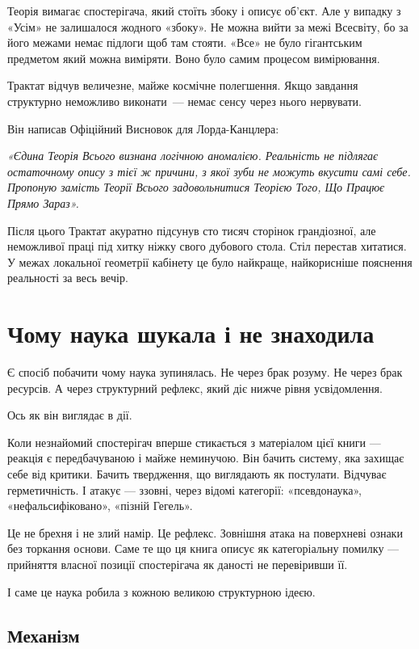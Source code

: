 \documentclass[12pt, a4paper, openany]{book}
\begin{document}
\begin{terrybox}
Теорія вимагає спостерігача, який стоїть збоку і описує об'єкт. Але у випадку з «Усім» не залишалося жодного «збоку». Не можна вийти за межі Всесвіту, бо за його межами немає підлоги щоб там стояти. «Все» не було гігантським предметом який можна виміряти. Воно було самим процесом вимірювання.

Трактат відчув величезне, майже космічне полегшення. Якщо завдання структурно неможливо виконати~--- немає сенсу через нього нервувати.

Він написав Офіційний Висновок для Лорда-Канцлера:

\medskip
\textit{«Єдина Теорія Всього визнана логічною аномалією. Реальність не підлягає остаточному опису з тієї ж причини, з якої зуби не можуть вкусити самі себе. Пропоную замість Теорії Всього задовольнитися Теорією Того, Що Працює Прямо Зараз».}

\medskip
Після цього Трактат акуратно підсунув сто тисяч сторінок грандіозної, але неможливої праці під хитку ніжку свого дубового стола. Стіл перестав хитатися. У межах локальної геометрії кабінету це було найкраще, найкорисніше пояснення реальності за весь вечір.
\end{terrybox}

\chapter{Чому наука шукала і не знаходила}

Є спосіб побачити чому наука зупинялась. Не через брак розуму. Не через брак ресурсів. А через структурний рефлекс, який діє нижче рівня усвідомлення.

Ось як він виглядає в дії.

Коли незнайомий спостерігач вперше стикається з матеріалом цієї книги — реакція є передбачуваною і майже неминучою. Він бачить систему, яка захищає себе від критики. Бачить твердження, що виглядають як постулати. Відчуває герметичність. І атакує — ззовні, через відомі категорії: «псевдонаука», «нефальсифіковано», «пізній Гегель».

Це не брехня і не злий намір. Це рефлекс. Зовнішня атака на поверхневі ознаки без торкання основи. Саме те що ця книга описує як категоріальну помилку — прийняття власної позиції спостерігача як даності не перевіривши її.

І саме це наука робила з кожною великою структурною ідеєю.

\section{Механізм}
\end{document}
